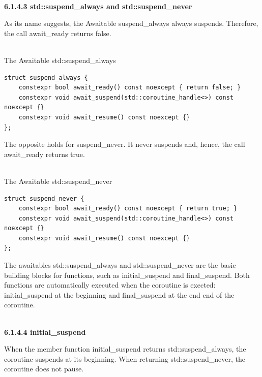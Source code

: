 \hspace*{\fill} \\ %
\noindent
\textbf{6.1.4.3\hspace{0.2cm} std::suspend\_always and std::suspend\_never}

As its name suggests, the Awaitable suspend\_always always suspends. Therefore, the call await\_ready returns false.

\hspace*{\fill} \\ %
\noindent
The Awaitable std::suspend\_always
\begin{lstlisting}[style=styleCXX]
struct suspend_always {
	constexpr bool await_ready() const noexcept { return false; }
	constexpr void await_suspend(std::coroutine_handle<>) const noexcept {}
	constexpr void await_resume() const noexcept {}
};
\end{lstlisting}

The opposite holds for suspend\_never. It never suspends and, hence, the call await\_ready returns
true.

\hspace*{\fill} \\ %
\noindent
The Awaitable std::suspend\_never
\begin{lstlisting}[style=styleCXX]
struct suspend_never {
	constexpr bool await_ready() const noexcept { return true; }
	constexpr void await_suspend(std::coroutine_handle<>) const noexcept {}
	constexpr void await_resume() const noexcept {}
};
\end{lstlisting}

The awaitables std::suspend\_always and std::suspend\_never are the basic building blocks for functions, such as initial\_suspend and final\_suspend. Both functions are automatically executed when the coroutine is exected: initial\_suspend at the beginning and final\_suspend at the end end of the coroutine.

\hspace*{\fill} \\ %
\noindent
\textbf{6.1.4.4\hspace{0.2cm} initial\_suspend}

When the member function initial\_suspend returns std::suspend\_always, the coroutine suspends at its beginning. When returning std::suspend\_never, the coroutine does not pause.

